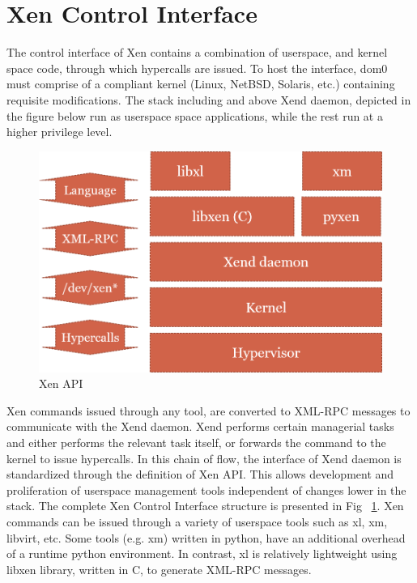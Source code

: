\section{Xen Control Interface}
The control interface of Xen contains a combination of userspace, and kernel space code, through which hypercalls are issued. To host the interface, dom0 must comprise of a compliant kernel (Linux, NetBSD, Solaris, etc.) containing requisite modifications. The stack including and above Xend daemon, depicted in the figure below run as userspace space applications, while the rest run at a higher privilege level. 


\begin{figure}[H]
\centering
\includegraphics[scale=0.6]{figures/XEN_API.png}
\caption{Xen API}
\label{fig:xen_api}
\end{figure}

Xen commands issued through any tool, are converted to XML-RPC messages to communicate with the Xend daemon. Xend performs certain managerial tasks and either performs the relevant task itself, or forwards the command to the kernel to issue hypercalls. In this chain of flow, the interface of Xend daemon is standardized through the definition of Xen API. This allows development and proliferation of userspace management tools independent of changes lower in the stack. The complete Xen Control Interface structure is presented in Fig ~\ref{fig:xen_api}. Xen commands can be issued through a variety of userspace tools such as xl, xm, libvirt, etc. Some tools (e.g. xm) written in python, have an additional overhead of a runtime python environment. In contrast, xl is relatively lightweight using libxen library, written in C, to generate XML-RPC messages. 

